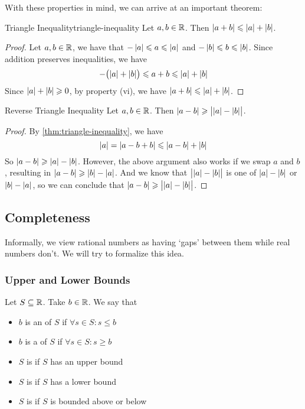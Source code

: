 \documentclass{styles/tufte}
\begin{document}
    With these properties in mind, we can arrive at an important theorem:
    
    \begin{theorem}{Triangle Inequality}{triangle-inequality}
      Let $a, b \in \mathbb{R}$. Then $\abs{a + b} \leqslant \abs{a} + \abs{b}$.
    \end{theorem}
    \begin{proof}
      Let $a, b \in \mathbb{R}$, we have that $-\abs{a} \leqslant a \leqslant \abs{a}$ and $-\abs{b} \leqslant b \leqslant \abs{b}$. Since addition preserves inequalities, we have
      \[ -\left(\abs{a} + \abs{b}\right) \leqslant a + b \leqslant \abs{a} + \abs{b} \]
      Since $\abs{a} + \abs{b} \geqslant 0$, by property (vi), we have $\abs{a + b} \leqslant \abs{a} + \abs{b}$.
    \end{proof}
    
    \begin{theorem}{Reverse Triangle Inequality}{}
      Let $a, b \in \mathbb{R}$. Then $\abs{a - b} \geqslant \abs{\abs{a} - \abs{b}}$.
    \end{theorem}
    \begin{proof}
      By \cref{thm:triangle-inequality}, we have
      \[ \abs{a} = \abs{a - b + b} \leqslant \abs{a - b} + \abs{b} \]
      So $\abs{a - b} \geqslant \abs{a} - \abs{b}$. However, the above argument also works if we swap $a$ and $b$, resulting in $\abs{a - b} \geqslant \abs{b} - \abs{a}$. And we know that $\abs{\abs{a} - \abs{b}}$ is one of $\abs{a} - \abs{b}$ or $\abs{b} - \abs{a}$, so we can conclude that $\abs{a - b} \geqslant \abs{\abs{a} - \abs{b}}$.
    \end{proof}
  
  
  \subsection{Completeness}
    
    Informally, we view rational numbers as having `gaps' between them while real numbers don't. We will try to formalize this idea.
    
    \subsubsection{Upper and Lower Bounds}
      
      \begin{definition}{}{}
        Let $S \subseteq \mathbb{R}$. Take $b \in \mathbb{R}$. We say that
        \begin{itemize}
          \item $b$ is an  of $S$ if $\forall s \in S : s \leqslant b$
          \item $b$ is a  of $S$ if $\forall s \in S : s \geqslant b$
          \item $S$ is  if $S$ has an upper bound
          \item $S$ is  if $S$ has a lower bound
          \item $S$ is  if $S$ is bounded above or below
        \end{itemize}
      \end{definition}
      
\end{document}

